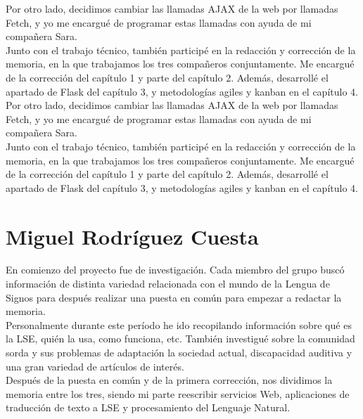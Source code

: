 Por otro lado, decidimos cambiar las llamadas AJAX de la web  por llamadas Fetch, y yo me encargué de programar estas llamadas con ayuda de mi compañera Sara. \\

Junto con el trabajo técnico, también participé en la redacción y corrección  de la memoria, en la que trabajamos los tres compañeros conjuntamente. Me encargué de la corrección del capítulo 1 y parte del capítulo 2. Además, desarrollé el apartado de Flask del capítulo 3,  y metodologías agiles y kanban en el capítulo 4.\\

Por otro lado, decidimos cambiar las llamadas AJAX de la web  por llamadas Fetch, y yo me encargué de programar estas llamadas con ayuda de mi compañera Sara. \\

Junto con el trabajo técnico, también participé en la redacción y corrección  de la memoria, en la que trabajamos los tres compañeros conjuntamente. Me encargué de la corrección del capítulo 1 y parte del capítulo 2. Además, desarrollé el apartado de Flask del capítulo 3,  y metodologías agiles y kanban en el capítulo 4.\\


\section{Miguel Rodríguez Cuesta}
\label{capTrabajoIndividual:sec:Miguel}

En comienzo del proyecto fue de investigación. Cada miembro del grupo buscó información de distinta variedad relacionada con el mundo de la Lengua de Signos para después realizar una puesta en común para empezar a redactar la memoria.\\

Personalmente durante este período he ido recopilando información sobre qué es la LSE, quién la usa, como funciona, etc. También investigué sobre la comunidad sorda y sus problemas de adaptación la sociedad actual, discapacidad auditiva y una gran variedad de artículos de interés.\\

Después de la puesta en común y de la primera corrección, nos dividimos la memoria entre los tres, siendo mi parte reescribir servicios Web, aplicaciones de traducción de texto a LSE y procesamiento del Lenguaje Natural.\\

